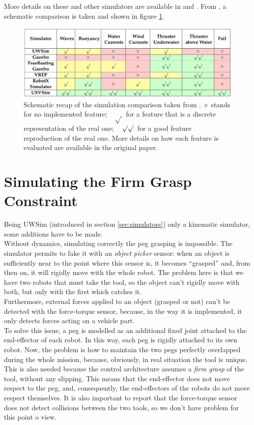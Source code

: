 More details on these and other simulators are available in \cite{simComparisonCook} and \cite{usvsim}. From \cite{usvsim}, a schematic comparison is taken and shown in figure \ref{fig:simComparison}.
\begin{figure}[H]
	\centering
	\includegraphics[width=14cm]{simComparison.png}
	\caption[Table of simulators comparison]{Schematic recap of the simulation comparison taken from \cite{usvsim}. $\times$ stands for no implemented feature; ~ $\surd\,$  for a feature that is a discrete representation of the real one; ~ $\surd\surd\,$ for a good feature reproduction of the real one. More details on how each feature is evaluated are available in the original paper.}
	\label{fig:simComparison}
\end{figure}


\section{Simulating the Firm Grasp Constraint}
\label{sec:firmGrasp}
Being UWSim (introduced in section \ref{sec:simulators}) only a kinematic simulator, some additions have to be made.\\
Without dynamics, simulating correctly the peg grasping is impossible. The simulator permits to fake it with an \textit{object picker} sensor: when an object is sufficiently near to the point where this sensor is, it becomes \enquote{grasped} and, from then on, it will rigidly move with the whole robot. The problem here is that we have two robots that must take the tool, so the object can't rigidly move with both, but only with the first which catches it. \\
Furthermore, external forces applied to an object (grasped or not) can't be detected with the force-torque sensor, because, in the way it is implemented, it only detects forces acting on a vehicle part.\\

To solve this issue, a peg is modelled as an additional fixed joint attached to the end-effector of each robot. In this way, each peg is rigidly attached to its own robot. Now, the problem is how to maintain the two pegs perfectly overlapped during the whole mission, because, obviously, in real situation the tool is unique. This is also needed because the control architecture assumes a \textit{firm grasp} of the tool, without any slipping. This means that the end-effector does not move respect to the peg, and, consequently, the end-effectors of the robots do not move respect themselves. It is also important to report that the force-torque sensor does not detect collisions between the two tools, so we don't have problem for this point o view.\\

